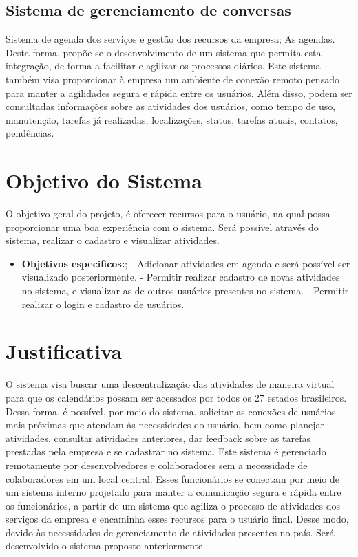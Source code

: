 \subsection{Sistema de gerenciamento de conversas}
Sistema de agenda dos serviços e gestão dos recursos da empresa; As agendas. Desta forma, propõe-se o desenvolvimento de um sistema que permita esta integração, de forma a facilitar e agilizar os processos diários. Este sistema também visa proporcionar à empresa um ambiente de conexão remoto pensado para manter a agilidades segura e rápida entre os usuários. Além disso, podem ser consultadas informações sobre as atividades dos usuários, como tempo de uso, manutenção, tarefas já realizadas, localizações, status, tarefas atuais, contatos, pendências.


\section{Objetivo do Sistema}
O objetivo geral do projeto, é oferecer recursos para o usuário, na qual possa proporcionar
uma boa experiência com o sistema. Será possível através do sistema, realizar o cadastro
e visualizar atividades.

\begin{itemize}


      \item \textbf{Objetivos especificos:};
            \subitem - Adicionar atividades em agenda e será possível ser visualizado posteriormente.
            \subitem - Permitir realizar cadastro de novas atividades no sistema, e visualizar as de outros usuários presentes no sistema.
            \subitem - Permitir realizar o login e cadastro de usuários.
\end{itemize}


\section{Justificativa}

O sistema visa buscar uma descentralização das atividades de maneira virtual para que os calendários possam ser acessados por todos os 27 estados brasileiros. Dessa forma, é possível, por meio do sistema, solicitar as conexões de usuários mais próximas que atendam às necessidades do usuário, bem como planejar atividades, consultar atividades anteriores, dar feedback sobre as tarefas prestadas pela empresa e se cadastrar no sistema. Este sistema é gerenciado remotamente por desenvolvedores e colaboradores sem a necessidade de colaboradores em um local central. Esses funcionários se conectam por meio de um sistema interno projetado para manter a comunicação segura e rápida entre os funcionários, a partir de um sistema que agiliza o processo de atividades dos serviços da empresa e encaminha esses recursos para o usuário final.
Desse modo, devido às necessidades de gerenciamento  de atividades presentes no país. Será desenvolvido o sistema proposto anteriormente.
